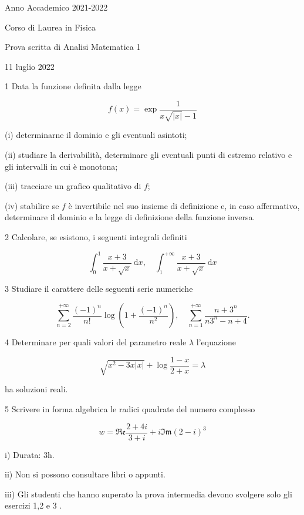 \documentclass[10pt]{article}
\begin{document}
Anno Accademico 2021-2022

Corso di Laurea in Fisica

Prova scritta di Analisi Matematica 1

11 luglio 2022

1 Data la funzione definita dalla legge

\[
f(x)=\exp \frac{1}{x \sqrt{|x|}-1}
\]

(i) determinarne il dominio e gli eventuali asintoti;

(ii) studiare la derivabilità, determinare gli eventuali punti di estremo relativo e gli intervalli in cui è monotona;

(iii) tracciare un grafico qualitativo di \(f\);

(iv) stabilire se \(f\) è invertibile nel suo insieme di definizione e, in caso affermativo, determinare il dominio e la legge di definizione della funzione inversa.

2 Calcolare, se esistono, i seguenti integrali definiti

\[
\int_{0}^{1} \frac{x+3}{x+\sqrt{x}} \mathrm{~d} x, \quad \int_{1}^{+\infty} \frac{x+3}{x+\sqrt{x}} \mathrm{~d} x
\]

3 Studiare il carattere delle seguenti serie numeriche

\[
\sum_{n=2}^{+\infty} \frac{(-1)^{n}}{n !} \log \left(1+\frac{(-1)^{n}}{n^{2}}\right), \quad \sum_{n=1}^{+\infty} \frac{n+3^{n}}{n 3^{n}-n+4} .
\]

4 Determinare per quali valori del parametro reale \(\lambda\) l'equazione

\[
\sqrt{x^{2}-3 x|x|}+\log \frac{1-x}{2+x}=\lambda
\]

ha soluzioni reali.

5 Scrivere in forma algebrica le radici quadrate del numero complesso

\[
w=\mathfrak{R e} \frac{2+4 i}{3+i}+i \mathfrak{I} \mathfrak{m}(2-i)^{3}
\]

i) Durata: 3h.

ii) Non si possono consultare libri o appunti.

iii) Gli studenti che hanno superato la prova intermedia devono svolgere solo gli esercizi 1,2 e 3 .
\end{document}
